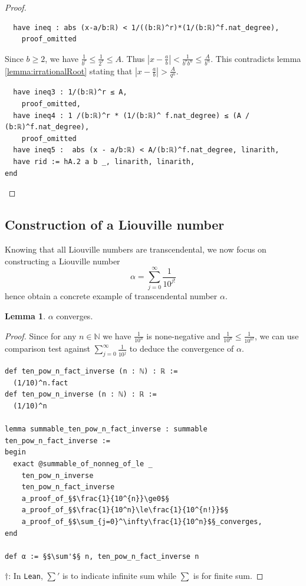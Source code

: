 \documentclass{report}
\theoremstyle{definition}
\newtheorem{lemma}{Lemma}[section]
\begin{document}
\begin{proof}
\begin{verbatim}
  have ineq : abs (x-a/b:ℝ) < 1/((b:ℝ)^r)*(1/(b:ℝ)^f.nat_degree),
    proof_omitted
\end{verbatim}

Since $b\ge 2$, we have $\frac1{b^r}\le\frac1{2^r}\le A$. Thus $\left|x-\frac a b\right|<\frac1{b^r b^n}\le \frac A{b^n}$. This contradicts lemma \ref{lemma:irrationalRoot} stating that $\left|x-\frac a b\right|>\frac{A}{q^n}$.
\begin{verbatim} 
  have ineq3 : 1/(b:ℝ)^r ≤ A,
    proof_omitted,
  have ineq4 : 1 /(b:ℝ)^r * (1/(b:ℝ)^ f.nat_degree) ≤ (A / (b:ℝ)^f.nat_degree),
    proof_omitted
  have ineq5 :  abs (x - a/b:ℝ) < A/(b:ℝ)^f.nat_degree, linarith,
  have rid := hA.2 a b _, linarith, linarith,
end
\end{verbatim}
\end{proof}

\subsection*{Construction of a Liouville number}

Knowing that all Liouville numbers are transcendental, we now focus on constructing a Liouville number $$\alpha=\sum_{j=0}^\infty \frac1{10^{j!}}$$hence obtain a concrete example of transcendental number $\alpha$.

\begin{lemma}
$\alpha$ converges.
\end{lemma}

\begin{proof}
Since for any $n\in\mathbb N$ we have $\frac 1{10^{n}}$ is none-negative and $\frac1{10^n}\le\frac1{10^{n!}}$, we can use comparison test against $\sum_{j=0}^\infty\frac1{10^j}$ to deduce the convergence of $\alpha$.

\begin{verbatim}
def ten_pow_n_fact_inverse (n : ℕ) : ℝ := 
  (1/10)^n.fact
def ten_pow_n_inverse (n : ℕ) : ℝ := 
  (1/10)^n

lemma summable_ten_pow_n_fact_inverse : summable ten_pow_n_fact_inverse :=
begin
  exact @summable_of_nonneg_of_le _ 
    ten_pow_n_inverse 
    ten_pow_n_fact_inverse 
    a_proof_of_§$\frac{1}{10^{n}}\ge0$§
    a_proof_of_§$\frac{1}{10^n}\le\frac{1}{10^{n!}}$§
    a_proof_of_§$\sum_{j=0}^\infty\frac{1}{10^n}$§_converges,
end

def α := §$\sum'$§ n, ten_pow_n_fact_inverse n
\end{verbatim}
$\dagger$: In {\tt \small Lean}, $\sum'$ is to indicate infinite sum while $\sum$ is for finite sum.
\end{proof}
\end{document}

